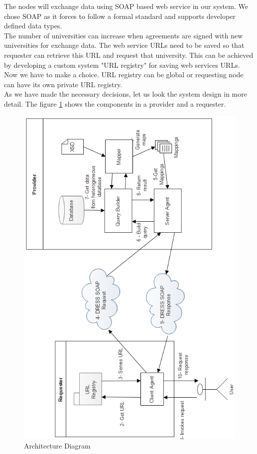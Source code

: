 \documentclass[12pt,a4paper,oneside]{book}
\begin{document}
The nodes will exchange data using SOAP based web service in our system.  We chose SOAP as it forces to follow a formal standard and supports developer defined data types. \\

The number of universities can increase when agreements are signed with new universities for exchange data. The web service URLs need to be saved so that requester can retrieve this URL and request that university. This can be achieved by developing a custom system "URL registry" for saving web services URLs. Now we have to make a choice. URL registry can be global or requesting node can have its own private URL registry. \\

As we have made the necessary decisions, let us look the system design in more detail. The figure \ref{fig:architecture} shows the components in a provider and a requester. 

\begin{figure}[!htp]
  \centering
  \includegraphics[width=14cm]{architecture.png}
  \caption{Architecture Diagram}
  \label{fig:architecture}
\end{figure}
\end{document}
